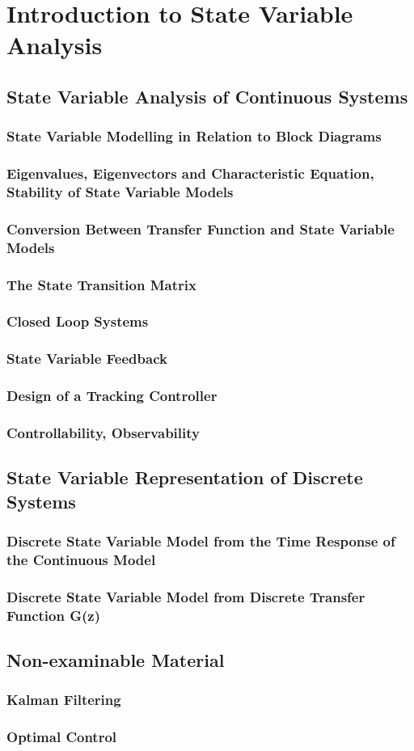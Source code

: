 \chapter{Introduction to State Variable Analysis}

\section{State Variable Analysis of Continuous Systems}
\subsection*{State Variable Modelling in Relation to Block Diagrams}
\subsection*{Eigenvalues, Eigenvectors and Characteristic Equation, Stability of State Variable Models}
\subsection*{Conversion Between Transfer Function and State Variable Models}
\subsection*{The State Transition Matrix}
\subsection*{Closed Loop Systems}
\subsection*{State Variable Feedback}
\subsection*{Design of a Tracking Controller}
\subsection*{Controllability, Observability}

\section{State Variable Representation of Discrete Systems}
\subsection*{Discrete State Variable Model from the Time Response of the Continuous Model}
\subsection*{Discrete State Variable Model from Discrete Transfer Function G(z)}

\section{Non-examinable Material}
\subsection*{Kalman Filtering}
\subsection*{Optimal Control}